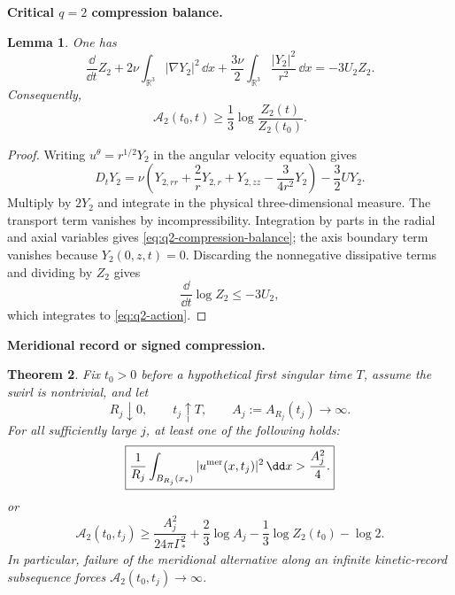 \documentclass[11pt]{article}
\newtheorem{theorem}{Theorem}[section]
\newtheorem{lemma}[theorem]{Lemma}
\theoremstyle{definition}\newtheorem{definition}[theorem]{Definition}
\theoremstyle{remark}\newtheorem{remark}[theorem]{Remark}
\begin{document}
\medskip
\noindent\textbf{Critical \(q=2\) compression balance.}
\begin{lemma}\label{lem:q2-balance}
One has
\begin{equation}\label{eq:q2-compression-balance}
 \boxed{
 \frac{\dd}{\dd t}Z_2
 +2\nu\int_{\mathbb R^3}|\nabla Y_2|^2\,\dd x
 +\frac{3\nu}{2}
  \int_{\mathbb R^3}\frac{|Y_2|^2}{r^2}\,\dd x
 =-3U_2Z_2.
 }
\end{equation}
Consequently,
\begin{equation}\label{eq:q2-action}
 \boxed{
 \mathcal A_2(t_0,t)
 \ge\frac13\log\frac{Z_2(t)}{Z_2(t_0)}.
 }
\end{equation}
\end{lemma}

\begin{proof}
Writing \(u^\theta=r^{1/2}Y_2\) in the angular velocity equation gives
\[
 D_tY_2
 =
 \nu\left(
 Y_{2,rr}+\frac2rY_{2,r}+Y_{2,zz}
 -\frac{3}{4r^2}Y_2
 \right)
 -\frac32UY_2.
\]
Multiply by \(2Y_2\) and integrate in the physical three-dimensional measure.
The transport term vanishes by incompressibility.  Integration by parts in
the radial and axial variables gives \eqref{eq:q2-compression-balance}; the axis boundary term
vanishes because \(Y_2(0,z,t)=0\).  Discarding the nonnegative dissipative
terms and dividing by \(Z_2\) gives
\[
 \frac{\dd}{\dd t}\log Z_2\le-3U_2,
\]
which integrates to \eqref{eq:q2-action}.
\end{proof}

\medskip
\noindent\textbf{Meridional record or signed compression.}
\begin{theorem}\label{thm:record-compression-fork}
Fix \(t_0>0\) before a hypothetical first singular time \(T\), assume the
swirl is nontrivial, and let
\[
 R_j\downarrow0,\qquad t_j\uparrow T,\qquad
 A_j:=A_{R_j}(t_j)\to\infty.
\]
For all sufficiently large \(j\), at least one of the following holds:
\begin{equation}\label{eq:meridional-record}
 \boxed{
 \frac1{R_j}
 \int_{B_{R_j}(x_*)}|u^{\rm mer}(x,t_j)|^2\,\dd x
 >
 \frac{A_j^2}{4}.
 }
\end{equation}
or
\begin{equation}\label{eq:signed-compression-debt}
 \boxed{
 \mathcal A_2(t_0,t_j)
 \ge
 \frac{A_j^2}{24\pi\Gamma_*^2}
 +\frac23\log A_j
 -\frac13\log Z_2(t_0)
 -\log2.
 }
\end{equation}
In particular, failure of the meridional alternative along an infinite
kinetic-record subsequence forces
\(\mathcal A_2(t_0,t_j)\to\infty\).
\end{theorem}
\end{document}
